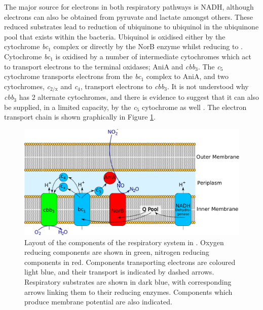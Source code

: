 The major source for electrons in both respiratory pathways is NADH, although electrons can also be obtained from pyruvate and lactate amongst others. These reduced substrates lead to reduction of ubiquinone to ubiquinol in the ubiquinone pool that exists within the bacteria. Ubiquinol is oxidised either by the cytochrome \textit{bc$_{\textrm{1}}$} complex or directly by the NorB enzyme whilst reducing \cNO\space to \cNtwoO. Cytochrome \textit{bc$_{\textrm{1}}$} is oxidised by a number of intermediate cytochromes which act to transport electrons to the terminal oxidases; AniA and \textit{cbb$_{\textrm{3}}$}. The \textit{c$_{\textrm{5}}$} cytochrome transports electrons from the \textit{bc$_{\textrm{1}}$} complex to AniA, and two cytochromes, \textit{c$_{\textrm{2/x}}$} and \textit{c$_{\textrm{4}}$}, transport electrons to \textit{cbb$_{\textrm{3}}$}. It is not understood why \textit{cbb$_{\textrm{3}}$} has 2 alternate cytochromes, and there is evidence to suggest that it can also be supplied, in a limited capacity, by the \textit{c$_{\textrm{5}}$} cytochrome as well \cite{Deeudom2008}. The electron transport chain is shown graphically in Figure \ref{fig:etc}.

\begin{figure}
 \begin{center}
 \includegraphics[width=14cm]{./01-introduction/data/Respiratory_layout.pdf}
\end{center}
\caption{\footnotesize Layout of the components of the respiratory system in \Nsm. Oxygen reducing components are shown in green, nitrogen reducing components in red. Components transporting electrons are coloured light blue, and their transport is indicated by dashed arrows. Respiratory substrates are shown in dark blue, with corresponding arrows linking them to their reducing enzymes. Components which produce membrane potential are also indicated.
\label{fig:etc}}
\end{figure}

